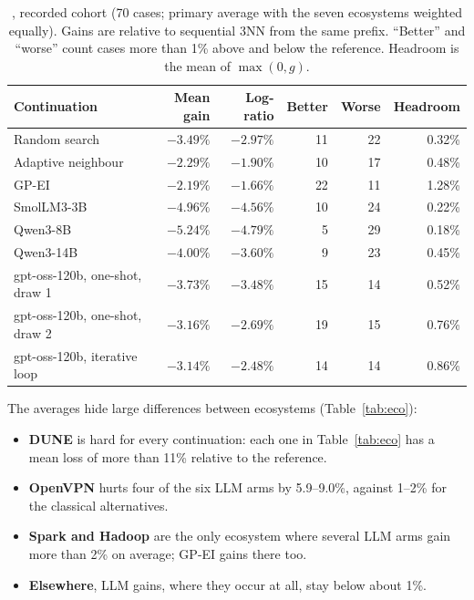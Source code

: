 \begin{table}[t]
\centering
\caption{, recorded cohort (70 cases; primary average with the seven ecosystems weighted equally). Gains are relative to sequential 3NN from the same prefix. ``Better'' and ``worse'' count cases more than 1\% above and below the reference. Headroom is the mean of $\max(0,g)$.}
\label{tab:rq1}
\small
\begin{tabular}{lrrrrr}
\toprule
Continuation & Mean gain & Log-ratio & Better & Worse & Headroom \\
\midrule
Random search & $-3.49\%$ & $-2.97\%$ & 11 & 22 & 0.32\% \\
Adaptive neighbour & $-2.29\%$ & $-1.90\%$ & 10 & 17 & 0.48\% \\
GP-EI & $-2.19\%$ & $-1.66\%$ & 22 & 11 & 1.28\% \\
\midrule
SmolLM3-3B & $-4.96\%$ & $-4.56\%$ & 10 & 24 & 0.22\% \\
Qwen3-8B & $-5.24\%$ & $-4.79\%$ & 5 & 29 & 0.18\% \\
Qwen3-14B & $-4.00\%$ & $-3.60\%$ & 9 & 23 & 0.45\% \\
gpt-oss-120b, one-shot, draw 1 & $-3.73\%$ & $-3.48\%$ & 15 & 14 & 0.52\% \\
gpt-oss-120b, one-shot, draw 2 & $-3.16\%$ & $-2.69\%$ & 19 & 15 & 0.76\% \\
gpt-oss-120b, iterative loop & $-3.14\%$ & $-2.48\%$ & 14 & 14 & 0.86\% \\
\bottomrule
\end{tabular}
\end{table}

The averages hide large differences between ecosystems (Table~\ref{tab:eco}):
\begin{itemize}
  \item \textbf{DUNE} is hard for every continuation: each one in Table~\ref{tab:eco} has a mean loss of more than 11\% relative to the reference.
  \item \textbf{OpenVPN} hurts four of the six LLM arms by 5.9--9.0\%, against 1--2\% for the classical alternatives.
  \item \textbf{Spark and Hadoop} are the only ecosystem where several LLM arms gain more than 2\% on average; GP-EI gains there too.
  \item \textbf{Elsewhere}, LLM gains, where they occur at all, stay below about 1\%.
\end{itemize}

